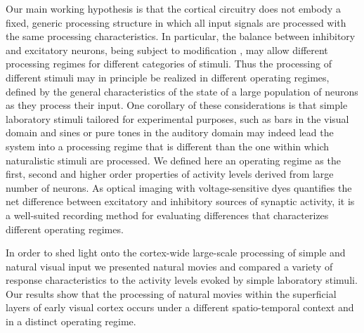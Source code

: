  Our main working hypothesis is that the cortical circuitry does not embody
 a fixed, generic processing structure in which all input signals are
 processed with the same processing characteristics. In particular, the
 balance between inhibitory and excitatory neurons, being subject to
 modification \citep{david2004a}, may allow different processing regimes
 for different categories of stimuli. Thus the processing of different
 stimuli may in principle be realized in different operating regimes,
 defined by the general characteristics of the state of a large population
 of neurons as they process their input. One corollary of these
 considerations is that simple laboratory stimuli tailored for experimental
 purposes, such as bars in the visual domain and sines or pure tones in the
 auditory domain may indeed lead the system into a processing regime that
 is different than the one within which naturalistic stimuli are processed.
 We defined here an operating regime as the first, second and higher order
 properties of activity levels derived from large number of neurons. As
 optical imaging with voltage-sensitive dyes quantifies the net difference
 between excitatory and inhibitory sources of synaptic activity, it is a
 well-suited recording method for evaluating differences that characterizes
 different operating regimes.
 
 In order to shed light onto the cortex-wide large-scale processing of
 simple and natural visual input we presented natural movies and compared a
 variety of response characteristics to the activity levels evoked by
 simple laboratory stimuli. Our results show that the processing of natural
 movies within the superficial layers of early visual cortex occurs under a
 different spatio-temporal context and in a distinct operating regime.


